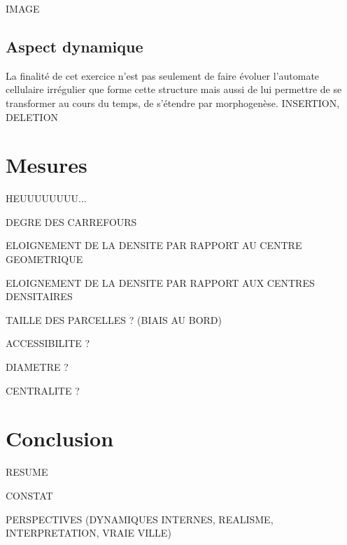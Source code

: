 \documentclass[12pt]{article}
\begin{document}
IMAGE

\subsection{Aspect dynamique}

La finalité de cet exercice n'est pas seulement de faire évoluer
l'automate cellulaire irrégulier que forme cette structure mais aussi
de lui permettre de se transformer au cours du temps, de s'étendre par
morphogenèse. INSERTION, DELETION

\section{Mesures}

HEUUUUUUUU...

DEGRE DES CARREFOURS

ELOIGNEMENT DE LA DENSITE PAR RAPPORT AU CENTRE GEOMETRIQUE

ELOIGNEMENT DE LA DENSITE PAR RAPPORT AUX CENTRES DENSITAIRES

TAILLE DES PARCELLES ? (BIAIS AU BORD)

ACCESSIBILITE ?

DIAMETRE ?

CENTRALITE ?

\section{Conclusion}

RESUME

CONSTAT

PERSPECTIVES (DYNAMIQUES INTERNES, REALISME, INTERPRETATION, VRAIE VILLE)

\printbibliography
\end{document}
